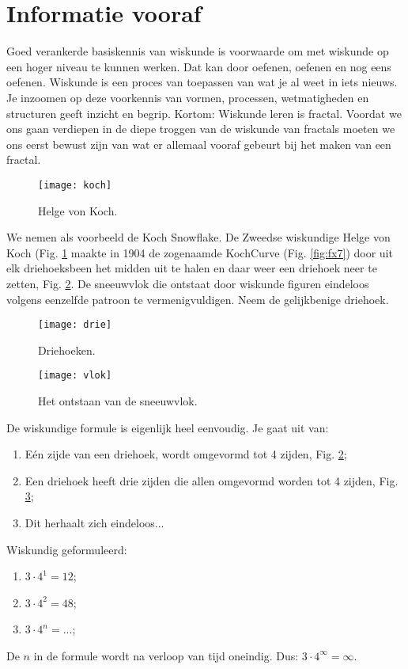 \documentclass[11pt,fleqn]{book} %
\begin{document}
\section{Informatie vooraf}
Goed verankerde basiskennis van wiskunde is voorwaarde om met wiskunde op een hoger niveau te kunnen werken. Dat kan door oefenen, oefenen en nog eens oefenen. Wiskunde is een proces van toepassen van wat je al weet in iets nieuws. Je inzoomen op deze voorkennis van vormen, processen, wetmatigheden en structuren geeft inzicht en begrip. Kortom: Wiskunde leren is fractal. 
Voordat we ons gaan verdiepen in de diepe troggen van de wiskunde van fractals moeten we ons eerst bewust zijn van wat er allemaal vooraf gebeurt bij het maken van een fractal.
\begin{figure}[h]
	\centering\texttt{[image: koch]}
	\caption{Helge von Koch.}
	\label{fig:koch}
\end{figure}
We nemen als voorbeeld de Koch Snowflake. De Zweedse wiskundige Helge von Koch (Fig. \ref{fig:koch} maakte in 1904 de zogenaamde KochCurve (Fig. \ref{fig:fx7})  door uit elk driehoeksbeen het midden uit te halen en daar weer een driehoek neer te zetten, Fig. \ref{fig:drie}. De sneeuwvlok die ontstaat door wiskunde figuren eindeloos volgens eenzelfde patroon te vermenigvuldigen. Neem de gelijkbenige driehoek.
\begin{figure}[h]
	\centering\texttt{[image: drie]}
	\caption{Driehoeken.}
	\label{fig:drie}
\end{figure}
\begin{figure}[h]
	\centering\texttt{[image: vlok]}
	\caption{Het ontstaan van de sneeuwvlok.}
	\label{fig:vlok}
\end{figure}
De wiskundige formule is eigenlijk heel eenvoudig.
Je gaat uit van:
\begin{enumerate}
\item Eén zijde van een driehoek, wordt omgevormd tot 4 zijden, Fig. \ref{fig:drie};
\item Een driehoek heeft drie zijden die allen omgevormd worden tot 4 zijden, Fig. \ref{fig:vlok};
\item Dit herhaalt zich eindeloos...
\end{enumerate}

Wiskundig geformuleerd:
\begin{enumerate}
\item $3\cdot 4^1 = 12$;
\item $3\cdot 4^2 = 48$;
\item $3\cdot 4^n = ...$;
\end{enumerate}
De $n$ in de formule wordt na verloop van tijd oneindig. Dus: $3\cdot 4^\infty = \infty$.
\end{document}
